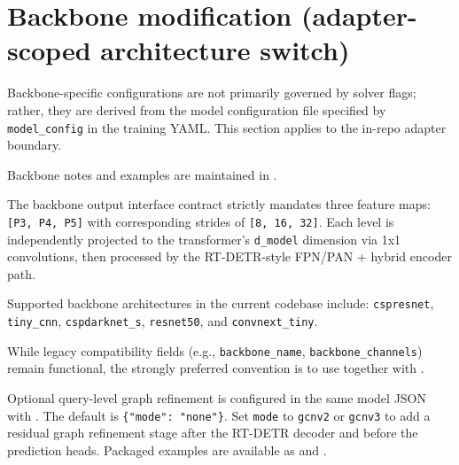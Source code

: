 \section{Backbone modification (adapter-scoped architecture switch)}
Backbone-specific configurations are not primarily governed by solver flags; rather, they are derived from the model configuration file specified by \texttt{model\_config} in the training YAML.
This section applies to the in-repo  adapter boundary.

Backbone notes and examples are maintained in .

The backbone output interface contract strictly mandates three feature maps: \texttt{[P3, P4, P5]} with corresponding strides of \texttt{[8, 16, 32]}. Each level is independently projected to the transformer's \texttt{d\_model} dimension via 1x1 convolutions, then processed by the RT-DETR-style FPN/PAN + hybrid encoder path.

Supported backbone architectures in the current codebase include:
\texttt{cspresnet}, \texttt{tiny\_cnn}, \texttt{cspdarknet\_s}, \texttt{resnet50}, and \texttt{convnext\_tiny}.

While legacy compatibility fields (e.g., \texttt{backbone\_name}, \texttt{backbone\_channels}) remain functional, the strongly preferred convention is to use  together with .

Optional query-level graph refinement is configured in the same model JSON with
. The default is \texttt{\{"mode": "none"\}}. Set
\texttt{mode} to \texttt{gcnv2} or \texttt{gcnv3} to add a residual graph
refinement stage after the RT-DETR decoder and before the prediction heads.
Packaged examples are available as  and
.

